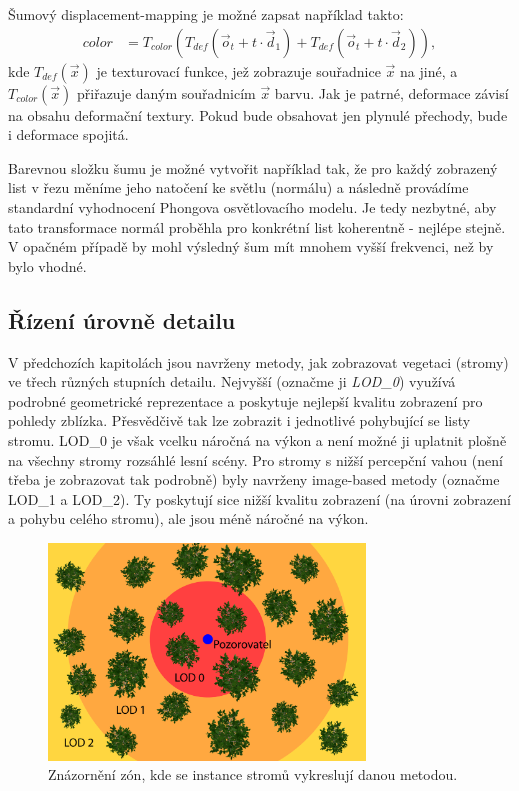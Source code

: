 Šumový displacement-mapping je možné zapsat například takto:
\begin{align} 
color &= T_{color}(T_{def}(\vec{o}_t + t \cdot \vec{d}_1)+T_{def}(\vec{o}_t + t \cdot \vec{d}_2)),
\end{align}
kde $T_{def}(\vec{x})$ je texturovací funkce, jež zobrazuje souřadnice $\vec{x}$ na jiné, a $T_{color}(\vec{x})$ přiřazuje daným souřadnicím $\vec{x}$ barvu. Jak je patrné, deformace závisí na obsahu deformační textury. Pokud bude obsahovat jen plynulé přechody, bude i deformace spojitá.



Barevnou složku šumu je možné vytvořit například tak, že pro každý zobrazený list v řezu měníme jeho natočení ke světlu (normálu) a následně provádíme standardní vyhodnocení Phongova osvětlovacího modelu. Je tedy nezbytné, aby tato transformace normál proběhla pro konkrétní list koherentně - nejlépe stejně. V opačném případě by mohl výsledný šum mít mnohem vyšší frekvenci, než by bylo vhodné.
\newpage

\subsection{Řízení úrovně detailu}
\label{sec-LODcontrol}
V předchozích kapitolách jsou navrženy metody, jak zobrazovat vegetaci (stromy) ve třech různých stupních detailu. Nejvyšší (označme ji \emph{LOD\_0}) využívá podrobné geometrické reprezentace a poskytuje nejlepší kvalitu zobrazení pro pohledy zblízka. Přesvědčivě tak lze zobrazit i jednotlivé pohybující se listy stromu. LOD\_0 je však vcelku náročná na výkon a není možné ji uplatnit plošně na všechny stromy rozsáhlé lesní scény. Pro stromy s nižší percepční vahou (není třeba je zobrazovat tak podrobně) byly navrženy image-based metody (označme LOD\_1 a LOD\_2). Ty poskytují sice nižší kvalitu zobrazení (na úrovni zobrazení a pohybu celého stromu), ale jsou méně náročné na výkon. 
\begin{figure}[!h]
\begin{center}
\includegraphics[width=0.75\textwidth]{./figures/LODcontrol.png}
\caption{Znázornění zón, kde se instance stromů vykreslují danou metodou.\label{fig:lodZones}}
\end{center}
\end{figure}

